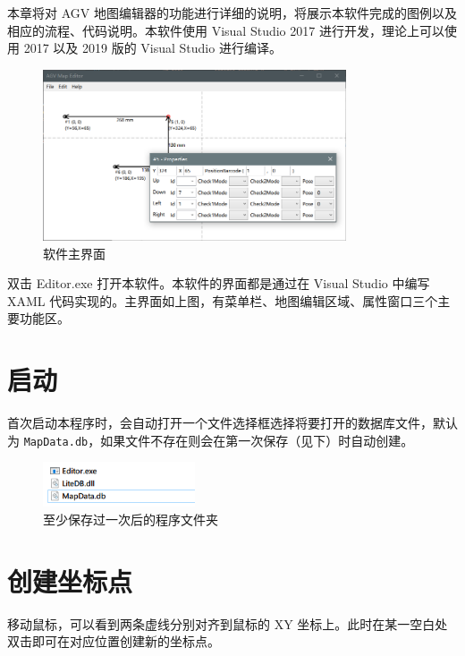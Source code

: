 
本章将对 AGV 地图编辑器的功能进行详细的说明，将展示本软件完成的图例以及相应的流程、代码说明。本软件使用 Visual Studio 2017 进行开发，理论上可以使用 2017 以及 2019 版的 Visual Studio 进行编译。

\begin{figure}[H]
  \centering
  \includegraphics[width=0.8\textwidth]{assets/mainview.png}
  \caption{软件主界面}
  \label{fig:mainview}
\end{figure}

双击 Editor.exe 打开本软件。本软件的界面都是通过在 Visual Studio 中编写 XAML 代码实现的。主界面如上图，有菜单栏、地图编辑区域、属性窗口三个主要功能区。

\section{启动}

首次启动本程序时，会自动打开一个文件选择框选择将要打开的数据库文件，默认为 \texttt{MapData.db}，如果文件不存在则会在第一次保存（见下）时自动创建。

\begin{figure}[H]
  \centering
  \includegraphics[width=0.4\textwidth]{assets/explorer.png}
  \caption{至少保存过一次后的程序文件夹}
  \label{fig:explorer}
\end{figure}

\section{创建坐标点}

移动鼠标，可以看到两条虚线分别对齐到鼠标的 XY 坐标上。此时在某一空白处双击即可在对应位置创建新的坐标点。


